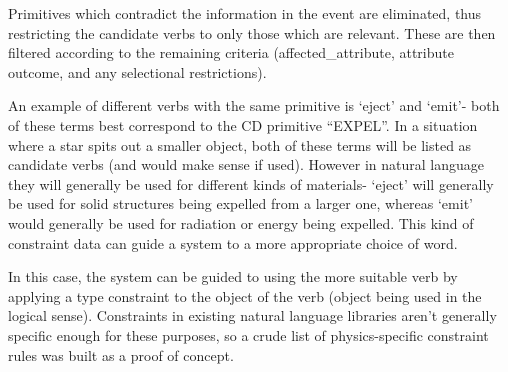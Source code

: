 \documentclass[dissertation.tex]{subfiles}
\begin{document}
    Primitives which contradict the information in the event are eliminated, thus restricting the candidate verbs to only those which are relevant. These are then filtered according to the remaining criteria (affected\_attribute, attribute outcome, and any selectional restrictions).

    An example of different verbs with the same primitive is `eject' and `emit'- both of these terms best correspond to the CD primitive ``EXPEL''. In a situation where a star spits out a smaller object, both of these terms will be listed as candidate verbs (and would make sense if used). However in natural language they will generally be used for different kinds of materials- `eject' will generally be used for solid structures being expelled from a larger one, whereas `emit' would generally be used for radiation or energy being expelled. This kind of constraint data can guide a system to a more appropriate choice of word.

    In this case, the system can be guided to using the more suitable verb by applying a type constraint to the object of the verb (object being used in the logical sense). Constraints in existing natural language libraries aren't generally specific enough for these purposes, so a crude list of physics-specific constraint rules was built as a proof of concept.
\end{document}
